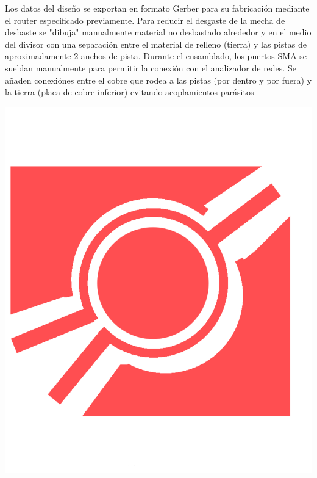 \documentclass[a4paper, 12pt]{article}
\begin{document}
\begin{minipage}{1\linewidth}
Los datos del diseño se exportan en formato Gerber para su fabricación mediante el router especificado previamente. Para reducir el desgaste de la mecha de desbaste se "dibuja" manualmente material no desbastado alrededor y en el medio del divisor con una separación entre el material de relleno (tierra) y las pistas de aproximadamente 2 anchos de pista.
Durante el ensamblado, los puertos SMA se sueldan manualmente para permitir la conexión con el analizador de redes.
Se añaden conexiónes entre el cobre que rodea a las pistas (por dentro y por fuera) y la tierra (placa de cobre inferior) evitando acoplamientos parásitos
\end{minipage}
\begin{minipage}{0.33\linewidth}
\includegraphics[width=0.99\linewidth]{./img/gerber.png}
\end{minipage}
\end{document}
